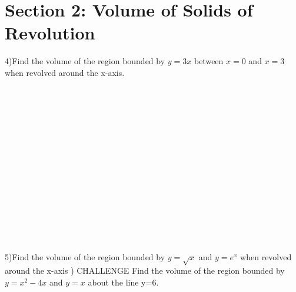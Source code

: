 \documentclass[12pt]{article}
\begin{document}
\section{Section 2: Volume of Solids of Revolution}
4)Find the volume of the region bounded by $y=3x$ between $x=0$ and $x=3$ when revolved around the x-axis.
\\\\\\\\\\\\\\\\\\\\\\\\\\\\\\\\
5)Find the volume of the region bounded by $y=\sqrt{x}$ and $y=e^x$ when revolved around the x-axis
) CHALLENGE
Find the volume of the region bounded by $y=x^2-4x$ and $y=x$ about the line y=6.

 
\end{document}
